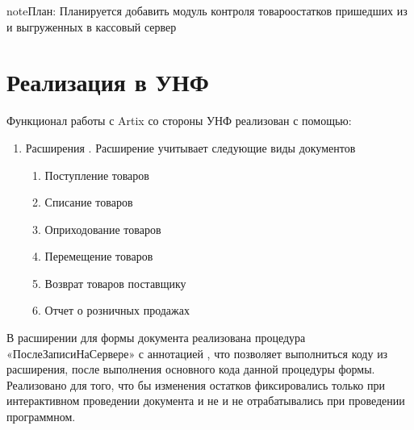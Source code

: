 \documentclass[letterpaper,10pt,russian]{sphinxmanual}
\begin{document}
\begin{sphinxadmonition}{note}{\label{\detokenize{description:id2}}План:}
\sphinxAtStartPar
Планируется добавить модуль контроля товаро\sphinxhyphen{}остатков пришедших из  и выгруженных в кассовый сервер
\end{sphinxadmonition}

\sphinxstepscope


\chapter{Реализация в УНФ}
\label{\detokenize{unf:id1}}\label{\detokenize{unf::doc}}
\sphinxAtStartPar
Функционал работы с Artix со стороны УНФ реализован с помощью:
\begin{enumerate}
%
\item {} 
\sphinxAtStartPar
Расширения . Расширение учитывает следующие виды документов
\begin{enumerate}
%
\item {} 
\sphinxAtStartPar
Поступление товаров

\item {} 
\sphinxAtStartPar
Списание товаров

\item {} 
\sphinxAtStartPar
Оприходование товаров

\item {} 
\sphinxAtStartPar
Перемещение товаров

\item {} 
\sphinxAtStartPar
Возврат товаров поставщику

\item {} 
\sphinxAtStartPar
Отчет о розничных продажах

\end{enumerate}

\end{enumerate}

\sphinxAtStartPar
В расширении для формы документа реализована процедура «ПослеЗаписиНаСервере»  с аннотацией ,
что позволяет выполниться коду из расширения, после выполнения основного кода данной процедуры формы.
Реализовано для того, что бы изменения остатков фиксировались только при интерактивном проведении документа и
не и не отрабатывались при проведении программном.

\begin{sphinxVerbatim}[commandchars=\\\{\}]
 
\end{sphinxVerbatim}
\end{document}
